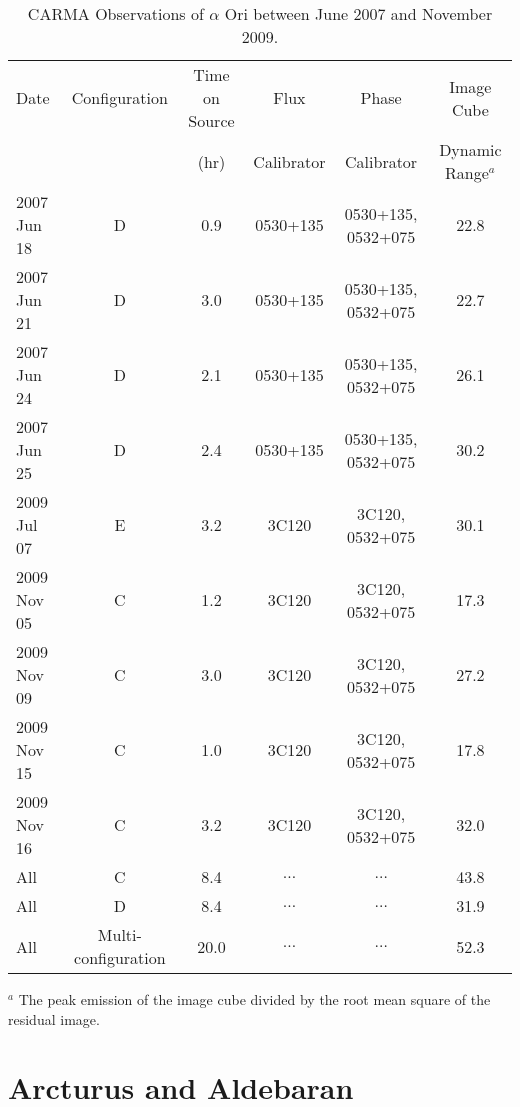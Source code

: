 \begin{landscape}
\begin{table}
\begin{center}
\caption[CARMA Observations of $\alpha$ Ori.]
{CARMA Observations of $\alpha$ Ori between June 2007 and November 2009.}
\begin{tabular}{lccccc}
\hline
\hline
\rule{0pt}{2.5ex}Date & Configuration & Time on Source & Flux		& Phase 	& Image Cube \\
	 & 				 &  (hr)		  & Calibrator	& Calibrator& Dynamic Range$^{a}$ \\
\hline
\rule{0pt}{2.5ex}2007 Jun 18 	& D & 0.9 & 0530+135	& 0530+135, 0532+075 	&  22.8 \\
2007 Jun 21 	& D & 3.0 & 0530+135	& 0530+135, 0532+075 	&  22.7 \\
2007 Jun 24 	& D & 2.1 & 0530+135	& 0530+135, 0532+075 	&  26.1 \\
2007 Jun 25 	& D & 2.4 & 0530+135	& 0530+135, 0532+075 	&  30.2 \\
2009 Jul 07	& E & 3.2 & 3C120 		& 3C120, 0532+075	& 30.1 \\
2009 Nov 05	& C & 1.2 & 3C120 		& 3C120, 0532+075 	& 17.3 \\
2009 Nov 09 	& C & 3.0 & 3C120 		& 3C120, 0532+075 	& 27.2 \\
2009 Nov 15	& C & 1.0 & 3C120 		& 3C120, 0532+075 	& 17.8 \\
2009 Nov 16	& C & 3.2 & 3C120 		& 3C120, 0532+075 	& 32.0  \\
All		& C & 8.4	&  $\dots$	& 	$\dots$	& 43.8 \\
All 		& D & 8.4 &  $\dots$	&  	$\dots$	& 31.9 \\
All 		& Multi-configuration & 20.0 & $\dots$& $\dots$ 	& 52.3 \\
\hline
\end{tabular}
\label{tab:3.3}
\begin{minipage}{19.5cm}
{\footnotesize \rule{0pt}{2.5ex} $^{a}$ The peak emission of the image cube divided by the root mean square of the residual image.}
\end{minipage}
\end{center}
\end{table}
\end{landscape}

\section{Arcturus and Aldebaran}\label{sec:3.4}

